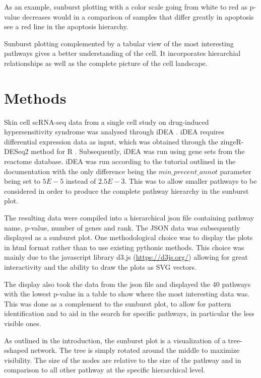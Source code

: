 \documentclass[11pt]{article}
\begin{document}
  As an example, sunburst plotting with a color scale going from white to red as p-value decreases would in a comparison of samples that differ greatly in apoptosis see a red line in the apoptosis hierarchy.

  Sunburst plotting complemented by a tabular view of the most interesting pathways gives a better understanding of the cell. It incorporates hierarchial relationships as well as the complete picture of the cell landscape.


\section*{Methods}
  Skin cell scRNA-seq data from a single cell study on drug-induced hypersensitivity syndrome was analysed through iDEA \cite{idea}. iDEA requires differential expression data as input, which was obtained through the zingeR-DESeq2 method for R \cite{deseq2}. Subsequently, iDEA was run using gene sets from the reactome database. iDEA was run according to the tutorial outlined in the documentation with the only difference being the $min\_precent\_annot$ parameter being set to $5E-5$ instead of $2.5E-3$. This was to allow smaller pathways to be considered in order to produce the complete pathway hierarchy in the sunburst plot.

  The resulting data were compiled into a hierarchical json file containing pathway name, p-value, number of genes and rank. The JSON data was subsequently displayed as a sunburst plot. One methodological choice was to display the plots in html format rather than to use existing pythonic methods. This choice was mainly due to the javascript library d3.js (\url{https://d3js.org/}) allowing for great interactivity and the ability to draw the plots as SVG vectors.

  The display also took the data from the json file and displayed the 40 pathways with the lowest p-value in a table to show where the most interesting data was. This was done as a complement to the sunburst plot, to allow for pattern identification and to aid in the search for specific pathways, in particular the less visible ones.

  As outlined in the introduction, the sunburst plot is a visualization of a tree-sshaped network. The tree is simply rotated around the middle to maximize visibility. The size of the nodes are relative to the size of the pathway and in comparison to all other pathway at the specific hierarchical level.
\end{document}
